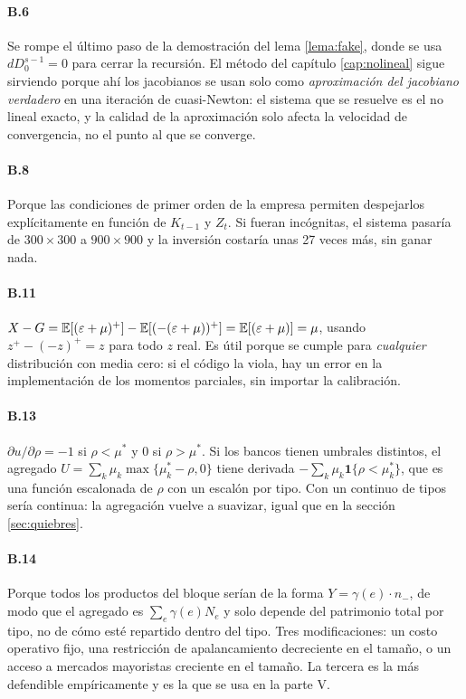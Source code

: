 \paragraph{B.6} Se rompe el último paso de la demostración del lema
\ref{lema:fake}, donde se usa $dD^{s-1}_0=0$ para cerrar la recursión. El método
del capítulo \ref{cap:nolineal} sigue sirviendo porque ahí los jacobianos se usan
solo como \emph{aproximación del jacobiano verdadero} en una iteración de
cuasi-Newton: el sistema que se resuelve es el no lineal exacto, y la calidad de
la aproximación solo afecta la velocidad de convergencia, no el punto al que se
converge.

\paragraph{B.8} Porque las condiciones de primer orden de la empresa permiten
despejarlos explícitamente en función de $K_{t-1}$ y $Z_t$. Si fueran incógnitas,
el sistema pasaría de $300\times300$ a $900\times900$ y la inversión costaría
unas 27 veces más, sin ganar nada.

\paragraph{B.11} $X - G = \mathbb{E}[(\varepsilon+\mu)^+] - \mathbb{E}[(-(\varepsilon+\mu))^+]
= \mathbb{E}[(\varepsilon+\mu)] = \mu$, usando $z^+ - (-z)^+ = z$ para todo $z$ real.
Es útil porque se cumple para \emph{cualquier} distribución con media cero: si el
código la viola, hay un error en la implementación de los momentos parciales, sin
importar la calibración.

\paragraph{B.13} $\partial u/\partial\rho = -1$ si $\rho<\mu^*$ y $0$ si
$\rho>\mu^*$. Si los bancos tienen umbrales distintos, el agregado
$U = \sum_k \mu_k \max\{\mu^*_k-\rho,0\}$ tiene derivada
$-\sum_k \mu_k \mathbf{1}\{\rho<\mu^*_k\}$, que es una función escalonada de
$\rho$ con un escalón por tipo. Con un continuo de tipos sería continua: la
agregación vuelve a suavizar, igual que en la sección \ref{sec:quiebres}.

\paragraph{B.14} Porque todos los productos del bloque serían de la forma
$Y = \gamma(e)\cdot n_-$, de modo que el agregado es $\sum_e \gamma(e) N_e$ y solo
depende del patrimonio total por tipo, no de cómo esté repartido dentro del tipo.
Tres modificaciones: un costo operativo fijo, una restricción de apalancamiento
decreciente en el tamaño, o un acceso a mercados mayoristas creciente en el
tamaño. La tercera es la más defendible empíricamente y es la que se usa en la
parte V.
